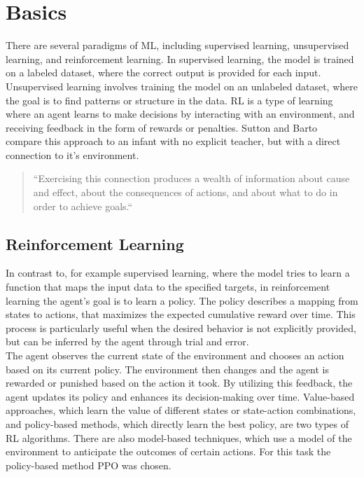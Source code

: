 

\section{Basics}\label{sec:basics}
There are several paradigms of ML, including supervised learning, unsupervised learning, and reinforcement learning.
In supervised learning, the model is trained on a labeled dataset, where the correct output is provided for each input.
Unsupervised learning involves training the model on an unlabeled dataset, where the goal is to find patterns or structure in the data.
RL is a type of learning where an agent learns to make decisions by interacting with an environment, and receiving feedback in the form of rewards or penalties.
Sutton and Barto~\cite{sutton_reinforcement_2018} compare this approach to an infant with no explicit teacher, but with a direct connection to it's environment.

\begin{quote}
    ``Exercising this connection produces a wealth of information about
    cause and effect, about the consequences of actions, and about what to do in order to
    achieve goals.``\cite{sutton_reinforcement_2018}
\end{quote}

\subsection{Reinforcement Learning}\label{subsec:reinforcement-learning}
In contrast to, for example supervised learning, where the model tries to learn a function that maps
the input data to the specified targets, in reinforcement learning the agent's goal is to learn a policy.
The policy describes a mapping from states to actions, that maximizes the expected cumulative reward over time.
This process is particularly useful when the desired behavior is not explicitly provided, but can be inferred by the agent
through trial and error.\\
The agent observes the current state of the environment and chooses an action based on its current policy.
The environment then changes and the agent is rewarded or punished based on the action it took.
By utilizing this feedback, the agent updates its policy and enhances its decision-making over time.
Value-based approaches, which learn the value of different states or state-action combinations, and policy-based methods, which directly learn the best policy, are two types of RL algorithms.
There are also model-based techniques, which use a model of the environment to anticipate the outcomes of certain actions.
For this task the policy-based method PPO was chosen.

